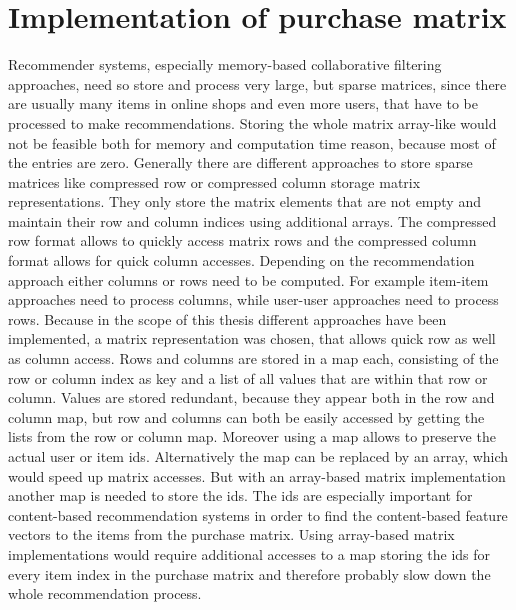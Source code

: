 \documentclass[10pt]{reportMaster}
\begin{document}
\section{Implementation of purchase matrix}
\label{sec:ImplementationOfPurchaseMatrix}
Recommender systems, especially memory-based collaborative filtering approaches, need so store and process very large, but sparse matrices, since there are usually many items in online shops and even more users, that have to be processed to make recommendations.
Storing the whole matrix array-like would not be feasible both for memory and computation time reason, because most of the entries are zero.
Generally there are different approaches to store sparse matrices like compressed row or compressed column storage matrix representations.
They only store the matrix elements that are not empty and maintain their row and column indices using additional arrays.
The compressed row format allows to quickly access matrix rows and the compressed column format allows for quick column accesses.
Depending on the recommendation approach either columns or rows need to be computed.
For example item-item approaches need to process columns, while user-user approaches need to process rows.
Because in the scope of this thesis different approaches have been implemented, a matrix representation was chosen, that allows quick row as well as column access.
Rows and columns are stored in a map each, consisting of the row or column index as key and a list of all values that are within that row or column.
Values are stored redundant, because they appear both in the row and column map, but row and columns can both be easily accessed by getting the lists from the row or column map.
Moreover using a map allows to preserve the actual user or item ids.
Alternatively the map can be replaced by an array, which would speed up matrix accesses.
But with an array-based matrix implementation another map is needed to store the ids.
The ids are especially important for content-based recommendation systems in order to find the content-based feature vectors to the items from the purchase matrix.
Using array-based matrix implementations would require additional accesses to a map storing the ids for every item index in the purchase matrix and therefore probably slow down the whole recommendation process.
\end{document}
